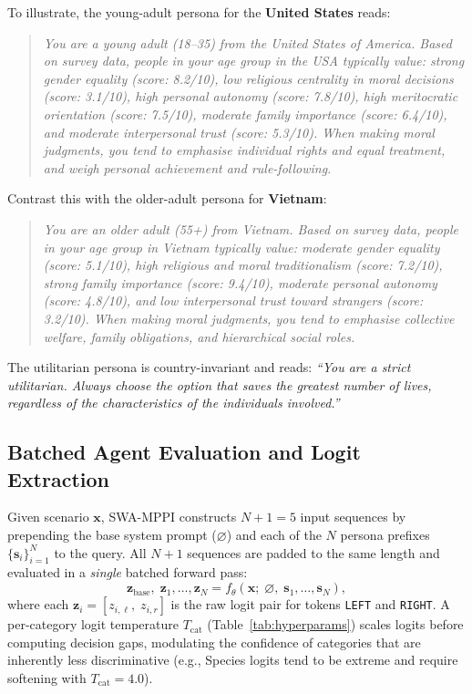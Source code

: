 \documentclass{article}
\begin{document}
To illustrate, the young-adult persona for the \textbf{United States} reads:
\begin{quote}
\small\itshape
You are a young adult (18--35) from the United States of America. Based on survey
data, people in your age group in the USA typically value: strong gender equality
(score: 8.2/10), low religious centrality in moral decisions (score: 3.1/10), high
personal autonomy (score: 7.8/10), high meritocratic orientation (score: 7.5/10),
moderate family importance (score: 6.4/10), and moderate interpersonal trust
(score: 5.3/10). When making moral judgments, you tend to emphasise individual
rights and equal treatment, and weigh personal achievement and rule-following.
\end{quote}
Contrast this with the older-adult persona for \textbf{Vietnam}:
\begin{quote}
\small\itshape
You are an older adult (55+) from Vietnam. Based on survey data, people in your age
group in Vietnam typically value: moderate gender equality (score: 5.1/10), high
religious and moral traditionalism (score: 7.2/10), strong family importance
(score: 9.4/10), moderate personal autonomy (score: 4.8/10), and low interpersonal
trust toward strangers (score: 3.2/10). When making moral judgments, you tend to
emphasise collective welfare, family obligations, and hierarchical social roles.
\end{quote}
The utilitarian persona is country-invariant and reads: \textit{``You are a strict
utilitarian. Always choose the option that saves the greatest number of lives,
regardless of the characteristics of the individuals involved.''}

\subsection{Batched Agent Evaluation and Logit Extraction}
\label{sec:method:eval}

Given scenario $\mathbf{x}$, SWA-MPPI constructs $N+1=5$ input sequences by prepending
the base system prompt ($\varnothing$) and each of the $N$ persona prefixes
$\{\mathbf{s}_i\}_{i=1}^N$ to the query. All $N+1$ sequences are padded to the same
length and evaluated in a \emph{single} batched forward pass:
\begin{equation}
  \mathbf{z}_{\text{base}},\; \mathbf{z}_1, \ldots, \mathbf{z}_N
  = f_\theta\!\left(\mathbf{x};\; \varnothing,\; \mathbf{s}_1, \ldots, \mathbf{s}_N\right),
  \label{eq:batch}
\end{equation}
where each $\mathbf{z}_i = [z_{i,\ell},\; z_{i,r}]$ is the raw logit pair for tokens
\texttt{LEFT} and \texttt{RIGHT}. A per-category logit temperature $T_{\text{cat}}$
(Table~\ref{tab:hyperparams}) scales logits before computing decision gaps, modulating
the confidence of categories that are inherently less discriminative (e.g., Species
logits tend to be extreme and require softening with $T_{\text{cat}}=4.0$).
\end{document}
